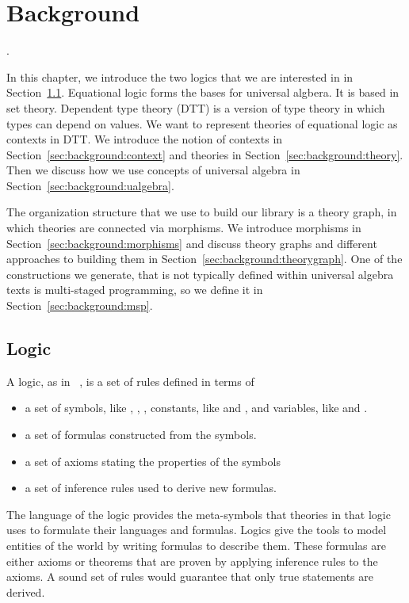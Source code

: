 \chapter{Background}
. 

In this chapter, we introduce the two logics that we are interested in in Section~\ref{sec:background:logic}. Equational logic forms the bases for universal algbera. It is based in set theory. Dependent type theory (DTT) is a version of type theory in which types can depend on values. We want to represent theories of equational logic as contexts in DTT. We introduce the notion of contexts in Section~\ref{sec:background:context} and theories in Section~\ref{sec:background:theory}. Then we discuss how we use concepts of universal algebra in Section~\ref{sec:background:ualgebra}. 

The organization structure that we use to build our library is a theory graph, in which theories are connected via morphisms. We introduce morphisms in Section~\ref{sec:background:morphisms} and discuss theory graphs and different approaches to building them in Section~\ref{sec:background:theorygraph}. 
One of the constructions we generate, that is not typically defined within universal algebra texts is multi-staged programming, so we define it in Section~\ref{sec:background:msp}. 

\section{Logic}
\label{sec:background:logic}
A logic, as in ~\cite{Gries1993FormalLogic}, is a set of rules defined in terms of 
\begin{itemize}
\item a set of symbols, like \lstmath{=}, \lstmath{$\wedge$}, \lstmath{$\vee$}, constants, like  and , and variables, like  and . 
\item a set of formulas constructed from the symbols.  
\item a set of axioms stating the properties of the symbols  
\item a set of inference rules used to derive new formulas.  
\end{itemize}
The language of the logic provides the meta-symbols that theories in that logic uses to formulate their languages and formulas. Logics give the tools to model entities of the world by writing formulas to describe them. These formulas are either axioms or theorems that are proven by applying inference rules to the axioms. A sound set of rules would guarantee that only true statements are derived. 

